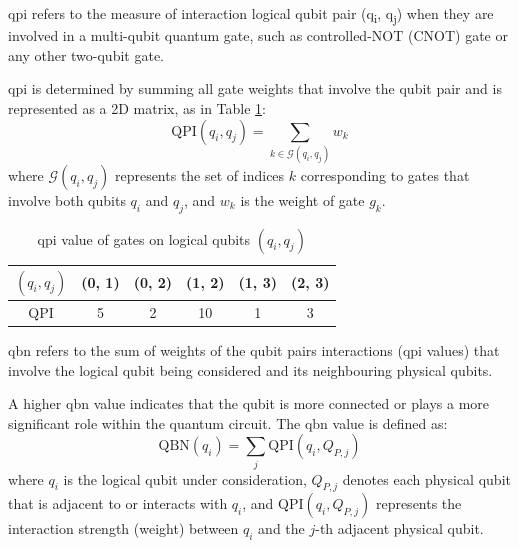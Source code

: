 \begin{definition}
    \acrfull{qpi} refers to the measure of interaction logical qubit pair (q\textsubscript{i}, q\textsubscript{j}) when they are involved in a multi-qubit quantum gate, such as controlled-NOT (CNOT) gate or any other two-qubit gate.
\end{definition}
\acrshort{qpi} is determined by summing all gate weights that involve the qubit pair and is represented as a 2D matrix, as in Table \ref{tab:qpi-matrix}:
\begin{equation}
    \text{QPI}(q_i, q_j) = \sum_{k \in \mathcal{G}(q_i, q_j)} w_k
\end{equation}
where $\mathcal{G}(q_i, q_j)$ represents the set of indices $k$ corresponding to gates that involve both qubits $q_i$ and $q_j$, and $w_k$ is the weight of gate $g_k$. \\
\begin{table}[h]
    \centering
    \begin{tabular}{|c|c|c|c|c|c|}
        \hline
        $(q_i, q_j)$ & (0, 1) & (0, 2) & (1, 2) & (1, 3) & (2, 3) \\
        \hline
        QPI & 5 & 2 & 10 & 1 & 3 \\
        \hline
    \end{tabular}
    \caption{\acrshort{qpi} value of gates on logical qubits $(q_i, q_j)$}
    \label{tab:qpi-matrix}
\end{table}

\begin{definition}
    \acrfull{qbn} refers to the sum of weights of the qubit pairs interactions (\acrshort{qpi} values) that involve the logical qubit being considered and its neighbouring physical qubits.
\end{definition}
A higher \acrshort{qbn} value indicates that the qubit is more connected or plays a more significant role within the quantum circuit. The \acrshort{qbn} value is defined as:
\begin{equation}
    \text{QBN}(q_i) = \sum_{j} \text{QPI}(q_i, Q_{P,j})
\end{equation}
where $q_i$ is the logical qubit under consideration, $Q_{P,j}$ denotes each physical qubit that is adjacent to or interacts with $q_i$, and $\text{QPI}(q_i, Q_{P,j})$ represents the interaction strength (weight) between $q_i$ and the $j$-th adjacent physical qubit.

